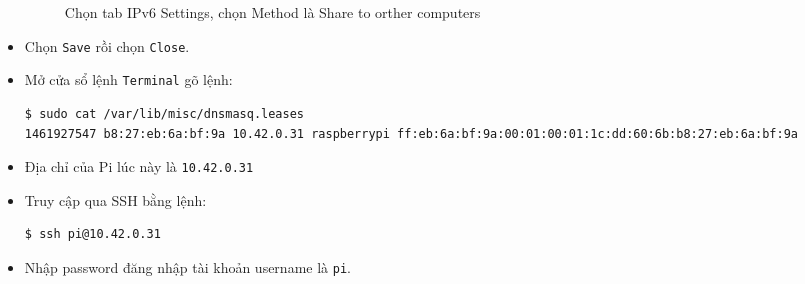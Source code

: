 \begin{itemize}
\begin{figure}[!h]
\begin{center}
\caption{Chọn tab \textsf{IPv6 Settings}, chọn \textsf{Method} là \textsf{Share to orther computers}}
\end{center}
\end{figure}
\item Chọn \verb|Save| rồi chọn \verb|Close|.
\item Mở cửa sổ lệnh \verb|Terminal| gõ lệnh:
\begin{lstlisting}[language=bash]
$ sudo cat /var/lib/misc/dnsmasq.leases
1461927547 b8:27:eb:6a:bf:9a 10.42.0.31 raspberrypi ff:eb:6a:bf:9a:00:01:00:01:1c:dd:60:6b:b8:27:eb:6a:bf:9a
\end{lstlisting}
\item Địa chỉ của Pi lúc này là \verb|10.42.0.31|
\item Truy cập qua SSH bằng lệnh:
\begin{lstlisting}[language=bash]
$ ssh pi@10.42.0.31
\end{lstlisting}
\item Nhập password đăng nhập tài khoản username là \verb|pi|.
\end{itemize}